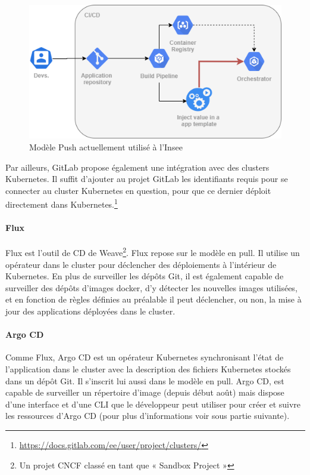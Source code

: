 \documentclass[11pt,fleqn]{book} %
\begin{document}
\begin{figure}[H]\centering
\renewcommand{\figurename}{Schéma}
\includegraphics[scale=0.55]{Pictures/CI-CD/insee-model.png}
\captionsetup{margin=1.5cm,format=hang,justification=justified}
\caption[]{Modèle Push actuellement utilisé à l'Insee \newline}
\end{figure}

Par ailleurs, GitLab propose également une intégration avec des clusters Kubernetes. Il suffit d’ajouter au projet GitLab les identifiants requis pour se connecter au cluster Kubernetes en question, pour que ce dernier déploit directement dans Kubernetes.\footnote{\url{https://docs.gitlab.com/ee/user/project/clusters/}}


\paragraph{Flux}
Flux est l’outil de CD de Weave\footnote{Un projet CNCF classé en tant que « Sandbox Project »}. Flux repose sur le modèle en pull. Il utilise un opérateur dans le cluster pour déclencher des déploiements à l'intérieur de Kubernetes. En plus de surveiller les dépôts Git, il est également capable de surveiller des dépôts d'images docker, d'y détecter les nouvelles images utilisées, et en fonction de règles définies au préalable il peut déclencher, ou non, la mise à jour des applications déployées dans le cluster.

\paragraph{Argo CD}
Comme Flux, Argo CD est un opérateur Kubernetes synchronisant l'état de l'application dans le cluster avec la description des fichiers Kubernetes stockés dans un dépôt Git. Il s’inscrit lui aussi dans le modèle en pull. Argo CD, est capable de surveiller un répertoire d'image (depuis début août) mais dispose d'une interface et d'une CLI que le développeur peut utiliser pour créer et suivre les ressources d’Argo CD (pour plus d'informations voir sous partie suivante).
\end{document}
